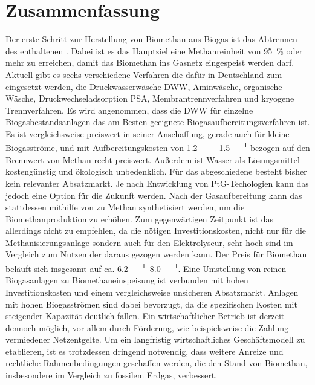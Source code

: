 
\section{Zusammenfassung}\label{ch_sum}

Der erste Schritt zur Herstellung von Biomethan aus Biogas ist das Abtrennen des enthaltenen . Dabei ist es das Hauptziel eine Methanreinheit von \SI{95}{\percent} oder mehr zu erreichen, damit das Biomethan ins Gasnetz eingespeist werden darf. Aktuell gibt es sechs verschiedene Verfahren die dafür in Deutschland zum eingesetzt werden, die Druckwasserwäsche \gls{DWW}, Aminwäsche, organische Wäsche, Druckwechseladsorption \gls{PSA}, Membrantrennverfahren und kryogene Trennverfahren. Es wird angenommen, dass die \gls{DWW} für einzelne Biogasbestandsanlagen das am Besten geeignete Biogasaufbereitungsverfahren ist. Es ist vergleichsweise preiswert in seiner Anschaffung, gerade auch für kleine Biogasströme, und mit Aufbereitungskosten von \SIrange{1,2}{1,5}{\ct\per\kwh} bezogen auf den Brennwert von Methan recht preiswert. Außerdem ist Wasser als Lösungsmittel kostengünstig und ökologisch unbedenklich.  \newline
Für das abgeschiedene  besteht bisher kein relevanter Absatzmarkt. Je nach Entwicklung von PtG-Techologien kann das jedoch eine Option für die Zukunft werden. Nach der Gasaufbereitung kann das  stattdessen mithilfe von  zu Methan synthetisiert werden, um die Biomethanproduktion zu erhöhen. Zum gegenwärtigen Zeitpunkt ist das allerdings nicht zu empfehlen, da die nötigen Investitionskosten, nicht nur für die Methanisierungsanlage sondern auch für den Elektrolyseur, sehr hoch sind im Vergleich zum Nutzen der daraus gezogen werden kann. \newline
Der Preis für Biomethan beläuft sich insgesamt auf ca. \SIrange{6,2}{8,0}{\ct\per\kwh}. Eine Umstellung von reinen Biogasanlagen zu Biomethaneinspeisung ist verbunden mit hohen Investitionskosten und einem vergleichsweise unsicheren Absatzmarkt. Anlagen mit hohen Biogasströmen sind dabei bevorzugt, da die spezifischen Kosten mit steigender Kapazität deutlich fallen. Ein wirtschaftlicher Betrieb ist derzeit dennoch möglich, vor allem durch Förderung, wie beispielsweise die Zahlung vermiedener Netzentgelte. Um ein langfristig wirtschaftliches Geschäftsmodell zu etablieren, ist es trotzdessen dringend notwendig, dass weitere Anreize und rechtliche Rahmenbedingungen geschaffen werden, die den Stand von Biomethan, insbesondere im Vergleich zu fossilem Erdgas, verbessert.
